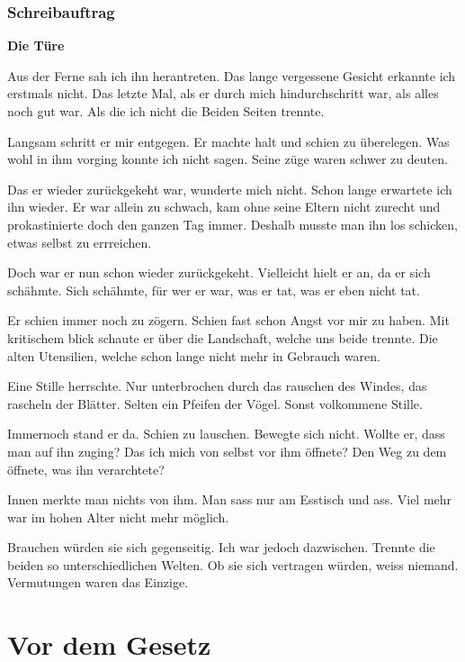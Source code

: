 \documentclass{article}
\begin{document}
\section{Schreibauftrag}
\textbf{Die Türe}
\begin{multicols}{2}
    Aus der Ferne sah ich ihn herantreten. Das lange vergessene Gesicht erkannte ich erstmals nicht. Das letzte Mal, als er durch mich hindurchschritt war, als alles noch gut war. Als die ich nicht die Beiden Seiten trennte.
    
    Langsam schritt er mir entgegen. Er machte halt und schien zu überelegen. Was wohl in ihm vorging konnte ich nicht sagen. Seine züge waren schwer zu deuten.

    Das er wieder zurückgekeht war, wunderte mich nicht. Schon lange erwartete ich ihn wieder. Er war allein zu schwach, kam ohne seine Eltern nicht zurecht und prokastinierte doch den ganzen Tag immer. Deshalb musste man ihn los schicken, etwas selbst zu errreichen.

    Doch war er nun schon wieder zurückgekeht. Vielleicht hielt er an, da er sich schähmte. Sich schähmte, für wer er war, was er tat, was er eben nicht tat.

    Er schien immer noch zu zögern. Schien fast schon Angst vor mir zu haben. Mit kritischem blick schaute er über die Landschaft, welche uns beide trennte. Die alten Utensilien, welche schon lange nicht mehr in Gebrauch waren.

    Eine Stille herrschte. Nur unterbrochen durch das rauschen des Windes, das rascheln der Blätter. Selten ein Pfeifen der Vögel. Sonst volkommene Stille.

    Immernoch stand er da. Schien zu lauschen. Bewegte sich nicht. Wollte er, dass man auf ihn zuging? Das ich mich von selbst vor ihm öffnete? Den Weg zu dem öffnete, was ihn verarchtete?

    Innen merkte man nichts von ihm. Man sass nur am Esstisch und ass. Viel mehr war im hohen Alter nicht mehr möglich.

    Brauchen würden sie sich gegenseitig. Ich war jedoch dazwischen. Trennte die beiden so unterschiedlichen Welten. Ob sie sich vertragen würden, weiss niemand. Vermutungen waren das Einzige.
\end{multicols}
\newpage


\part{Vor dem Gesetz}
\end{document}

